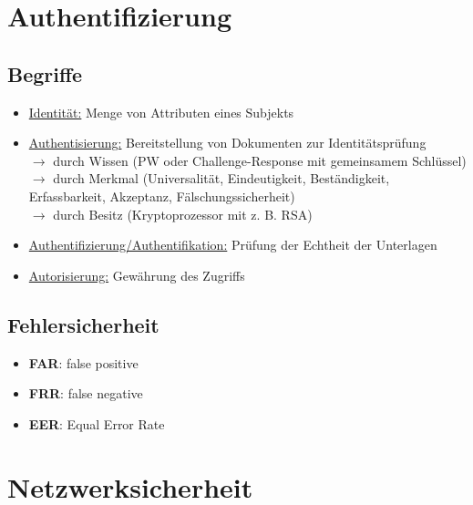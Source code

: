\section{Authentifizierung}

\subsection{Begriffe}
\begin{itemize}
	\item \underline{Identität:} Menge von Attributen eines Subjekts
	\item \underline{Authentisierung:} Bereitstellung von Dokumenten zur Identitätsprüfung\\ $\rightarrow$ durch Wissen (PW oder Challenge-Response mit gemeinsamem Schlüssel)\\ $\rightarrow$ durch Merkmal (Universalität, Eindeutigkeit, Beständigkeit, Erfassbarkeit, Akzeptanz, Fälschungssicherheit)\\ $\rightarrow$ durch Besitz (Kryptoprozessor mit z. B. RSA)
	\item \underline{Authentifizierung/Authentifikation:} Prüfung der Echtheit der Unterlagen
	\item \underline{Autorisierung:} Gewährung des Zugriffs
\end{itemize}

\subsection{Fehlersicherheit}
\begin{itemize}
	\item \textbf{FAR}: false positive
	\item \textbf{FRR}: false negative
	\item \textbf{EER}: Equal Error Rate
\end{itemize}

\section{Netzwerksicherheit}

